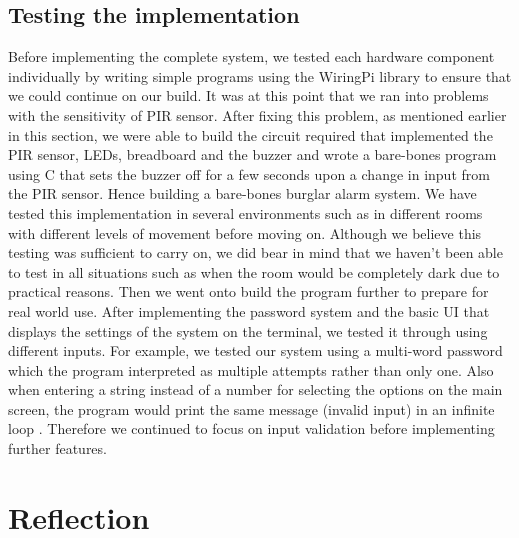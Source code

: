 \documentclass[11pt]{article}
\begin{document}
\subsection{Testing the implementation}
Before implementing the complete system, we tested each hardware component individually by writing simple programs using the WiringPi library to ensure that we could continue on our build. It was at this point that we ran into problems with the sensitivity of PIR sensor. After fixing this problem, as mentioned earlier in this section, we were able to build the circuit required that implemented the PIR sensor, LEDs, breadboard and the buzzer and wrote a bare-bones program using C that sets the buzzer off for a few seconds upon a change in input from the PIR sensor. Hence building a bare-bones burglar alarm system. We have tested this implementation in several environments such as in different rooms with different levels of movement before moving on. Although we believe this testing was sufficient to carry on, we did bear in mind that we haven't been able to test in all situations such as when the room would be completely dark due to practical reasons. Then we went onto build the program further to prepare for real world use. After implementing the password system and the basic UI that displays the settings of the system on the terminal, we tested it through using different inputs. For example, we tested our system using a multi-word password which the program interpreted as multiple attempts rather than only one. Also when entering a string instead of a number for selecting the options on the main screen, the program would print the same message (invalid input) in an infinite loop . Therefore we continued to focus on input validation before implementing further features.

\section{Reflection}
\end{document}
